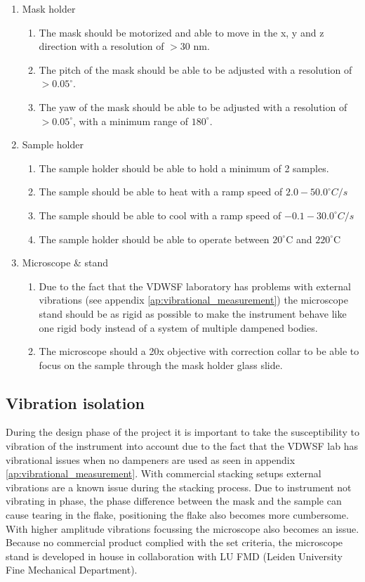 \documentclass[10pt]{article}
\begin{document}
\begin{enumerate}[noitemsep]
  \item Mask holder
  \begin{enumerate}[noitemsep]
    \item The mask should be motorized and able to move in the x, y and z direction with a resolution of $>30$ nm.
    \item The pitch of the mask should be able to be adjusted with a resolution of $>0.05^{\circ}$.
    \item The yaw of the mask should be able to be adjusted with a resolution of $>0.05^{\circ}$, with a minimum range of $180^{\circ}$.
  \end{enumerate}
  \item Sample holder
  \begin{enumerate}[noitemsep]
    \item The sample holder should be able to hold a minimum of 2 samples.
    \item The sample should be able to heat with a ramp speed of $2.0 - 50.0^{\circ} C/s$
    \item The sample should be able to cool with a ramp speed of $-0.1 - 30.0^{\circ} C/s$ 
    \item The sample holder should be able to operate between $20^\circ$C and $220^\circ$C
  \end{enumerate}
  \item Microscope \& stand
  \begin{enumerate}[noitemsep]
    \item Due to the fact that the VDWSF laboratory has problems with external vibrations (see appendix \ref{ap:vibrational_measurement}) the microscope stand should be as rigid as possible to make the instrument behave like one rigid body instead of a system of multiple dampened bodies.
    \item The microscope should a 20x objective with correction collar to be able to focus on the sample through the mask holder glass slide.
  \end{enumerate}


\end{enumerate}

\subsection{Vibration isolation}
\label{ch:vibration_isolation}
During the design phase of the project it is important to take the susceptibility to vibration of the instrument into account due to the fact that the VDWSF lab has vibrational issues when no dampeners are used as seen in appendix \ref{ap:vibrational_measurement}.
With commercial stacking setups external vibrations are a known issue during the stacking process. 
Due to instrument not vibrating in phase, the phase difference between the mask and the sample can cause tearing in the flake, positioning the flake also becomes more cumbersome.
With higher amplitude vibrations focussing the microscope also becomes an issue.
Because no commercial product complied with the set criteria, the microscope stand is developed in house in collaboration with LU FMD (Leiden University Fine Mechanical Department).\\
\end{document}
